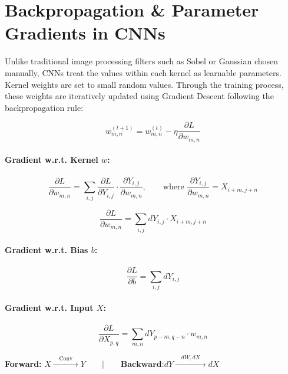 \section{Backpropagation \& Parameter Gradients in CNNs}

Unlike traditional image processing filters such as Sobel or Gaussian chosen manually, CNNs treat the values within each kernel as learnable parameters. Kernel weights are set to small random values. Through the training process, these weights are iteratively updated using Gradient Descent following the backpropagation rule:

\begin{equation}
w_{m,n}^{(t+1)} = w_{m,n}^{(t)} - \eta \frac{\partial L}{\partial w_{m,n}}
\end{equation}

\paragraph{Gradient w.r.t. Kernel $w$:}
\begin{equation}
\frac{\partial L}{\partial w_{m,n}} = \sum_{i,j} \frac{\partial L}{\partial Y_{i,j}} \cdot \frac{\partial Y_{i,j}}{\partial w_{m,n}}, \qquad \text{where } \frac{\partial Y_{i,j}}{\partial w_{m,n}} = X_{i+m, j+n}
\end{equation}

\begin{equation}
\boxed{\frac{\partial L}{\partial w_{m,n}} = \sum_{i,j} dY_{i,j} \cdot X_{i+m, j+n}}
\end{equation}

\paragraph{Gradient w.r.t. Bias $b$:}
\begin{equation}
\frac{\partial L}{\partial b} = \sum_{i,j} dY_{i,j}
\end{equation}

\paragraph{Gradient w.r.t. Input $X$:}
\begin{equation}
\frac{\partial L}{\partial X_{p,q}} = \sum_{m,n} dY_{p-m, q-n} \cdot w_{m,n}
\end{equation}

\begin{center}
\textbf{Forward:} $X \xrightarrow{\quad \text{Conv} \quad} Y \qquad \mathbf{\vert} \qquad \textbf{Backward:} dY \xrightarrow{\quad dW, dX \quad} dX$
\end{center}

